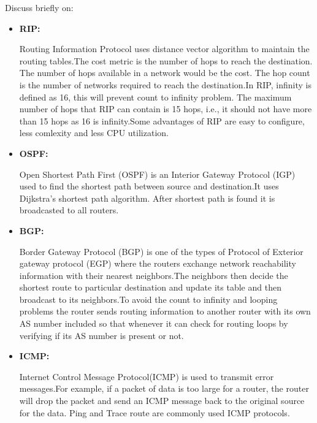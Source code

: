 \documentclass[a4paper,11pt]{article}
\begin{document}

\begin{Q}
    {
        Discuss briefly on:
    }
\end{Q}
\begin{A}
    {
        \begin{itemize}
            \item {\Large \textbf{ RIP:}}

                  Routing Information Protocol uses distance vector algorithm to maintain the routing tables.The cost metric is the number of hops to reach the destination. The number of hops available in a network would be the cost. The hop count is the number of networks required to reach the destination.In RIP, infinity is defined as 16, this will prevent count to infinity problem. The maximum number of hops that RIP can contain is 15 hops, i.e., it should not have more than 15 hops as 16 is infinity.Some advantages of RIP are easy to configure, less comlexity and less CPU utilization.



            \item {\Large \textbf{ OSPF:}}

                  Open Shortest Path First (OSPF) is an Interior Gateway Protocol (IGP) used to find the shortest path between source and destination.It uses Dijkstra's shortest path algorithm. After shortest path is found it is broadcasted to all routers.


            \item {\Large \textbf{ BGP:}}

                  Border Gateway Protocol (BGP) is one of the types of Protocol of Exterior gateway protocol (EGP) where the routers exchange network reachability information with their nearest neighbors.The neighbors then decide the shortest route to particular destination and update its table and then broadcast to its neighbors.To avoid
                  the count to infinity and looping problems the router sends routing information to another router with its own AS number included so that whenever it can check for routing loops by verifying if its AS number is present or not.


            \item {\Large \textbf{ ICMP:}}

                  Internet Control Message Protocol(ICMP) is used to transmit error messages.For example, if a packet of data is too large for a router, the router will drop the packet and send an ICMP message back to the original source for the data. Ping and Trace route are commonly used ICMP protocols.

        \end{itemize}
    }
\end{A}
\end{document}
